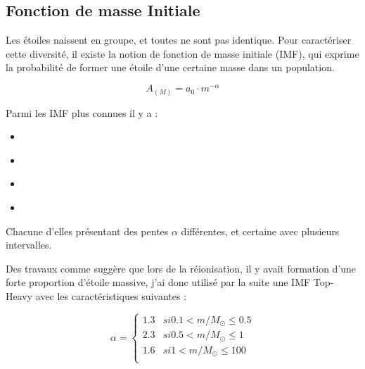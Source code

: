 

\subsection{Fonction de masse Initiale}

Les étoiles naissent en groupe, et toutes ne sont pas identique.
Pour caractériser cette diversité, il existe la notion de fonction de masse initiale (\ac{IMF}), qui exprime la probabilité de former une étoile d'une certaine masse dans un population.

\begin{equation}
A_{(M)} = a_0 \cdot m^{-\alpha}
\end{equation}

Parmi les \ac{IMF} plus connues il y a :

\begin{itemize}
\item \cite{1955ApJ...121..161S}
\item \cite{1979ApJS...41..513M}
\item \cite{2001MNRAS.322..231K}
\item \cite{2003PASP..115..763C}
\end{itemize}

Chacune d'elles présentant des pentes $\alpha$ différentes, et certaine avec plusieurs intervalles.


Des travaux comme \cite{2003MNRAS.344L...7C} suggère que lors de la réionisation, il y avait formation d'une forte proportion d'étoile massive, j'ai donc utilisé par la suite une \ac{IMF} Top-Heavy avec les caractéristiques suivantes :

\begin{equation}
	\alpha = 
  	\begin{cases}
	1.3 & si 0.1 < m/M_\odot \leq 0.5\\
	2.3 & si 0.5 < m/M_\odot \leq 1 \\
	1.6 & si 1   < m/M_\odot \leq 100 \\
	\end{cases}
\end{equation} 


